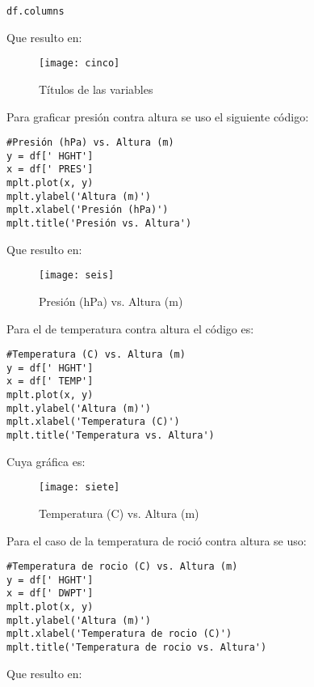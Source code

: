 \documentclass[12pt,letterpaper]{article}
\begin{document}
\begin{verbatim}
df.columns
\end{verbatim}

Que resulto en:

\begin{figure}[H]
\begin{center}
\texttt{[image: cinco]}
\end{center}
\caption{Títulos de las variables}
\end{figure}

Para graficar presión contra altura se uso el siguiente código:

\begin{verbatim}
#Presión (hPa) vs. Altura (m)
y = df[' HGHT']
x = df[' PRES']
mplt.plot(x, y)
mplt.ylabel('Altura (m)')
mplt.xlabel('Presión (hPa)')
mplt.title('Presión vs. Altura')
\end{verbatim}

Que resulto en:
\begin{figure}[H]
\begin{center}
\texttt{[image: seis]}
\end{center}
\caption{Presión (hPa) vs. Altura (m)}
\end{figure}

Para el de temperatura contra altura el código es:
\begin{verbatim}
#Temperatura (C) vs. Altura (m)
y = df[' HGHT']
x = df[' TEMP']
mplt.plot(x, y)
mplt.ylabel('Altura (m)')
mplt.xlabel('Temperatura (C)')
mplt.title('Temperatura vs. Altura')
\end{verbatim}

Cuya gráfica es:

\begin{figure}[H]
\begin{center}
\texttt{[image: siete]}
\end{center}
\caption{Temperatura (C) vs. Altura (m)}
\end{figure}

Para el caso de la temperatura de roció contra altura se uso:

\begin{verbatim}
#Temperatura de rocio (C) vs. Altura (m)
y = df[' HGHT']
x = df[' DWPT']
mplt.plot(x, y)
mplt.ylabel('Altura (m)')
mplt.xlabel('Temperatura de rocio (C)')
mplt.title('Temperatura de rocio vs. Altura')
\end{verbatim}

Que resulto en:
\end{document}
